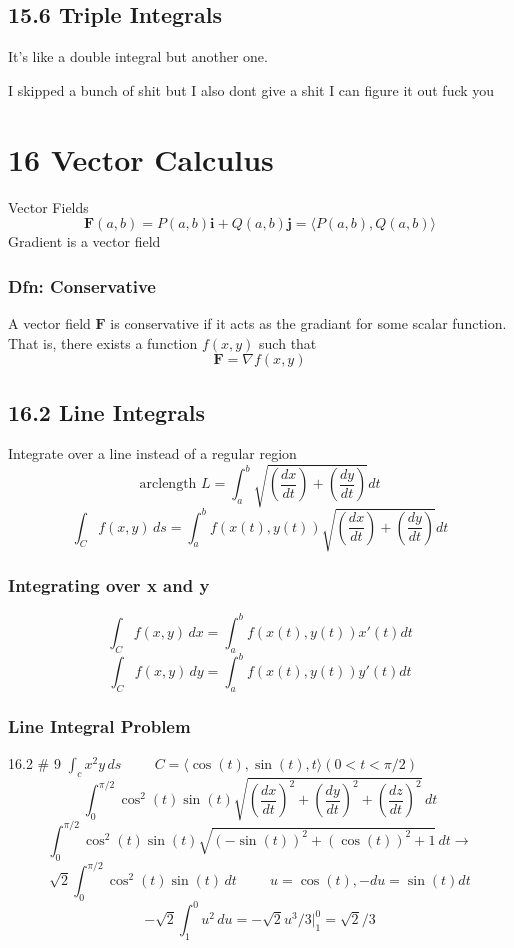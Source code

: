 \documentclass{report}
\begin{document}
\section{15.6 Triple Integrals}
It's like a double integral but another one.


I skipped a bunch of shit but I also dont give a shit I can figure it out fuck you



\chapter{16 Vector Calculus}
Vector Fields
$$
\mathbf{F}(a, b) = P(a, b)\mathbf{i} + Q(a, b)\mathbf{j} =
\langle P(a, b), Q(a, b) \rangle
$$
Gradient is a vector field

\subsection{Dfn: Conservative}
A vector field $\mathbf{F}$ is conservative if it acts as the gradiant for some scalar function. That is, there exists a function $f(x, y)$ such that 
$$
\mathbf{F} = \nabla f(x, y)
$$

\newpage
\section{16.2 Line Integrals}
Integrate over a line instead of a regular region
$$
\text{arclength } L = \int_a^b \sqrt{\left( \frac{dx}{dt} \right) + \left( \frac{dy}{dt} \right)} dt
$$
$$
\int_C f(x, y)\,ds = \int_a^b f(x(t), y(t)) \sqrt{\left( \frac{dx}{dt} \right) + \left( \frac{dy}{dt} \right)} dt
$$

\subsection*{Integrating over x and y}
$$
\int_C f(x, y)\,dx = \int_a^b f(x(t), y(t)) x'(t) dt
$$
$$
\int_C f(x, y)\,dy = \int_a^b f(x(t), y(t)) y'(t) dt
$$

\subsection{Line Integral Problem}
16.2 \# 9
$ \int_c x^2y \,ds \hspace{1cm} C = \langle \cos(t), \sin(t), t \rangle (0 < t < \pi/2) $
$$
\int_0^{\pi/2} \cos^2(t) \sin(t) \sqrt{(\frac{dx}{dt})^2 + (\frac{dy}{dt})^2 + (\frac{dz}{dt})^2} \, dt
$$
$$
\int_0^{\pi/2} \cos^2(t) \sin(t) \sqrt{(-\sin(t))^2 + (\cos(t))^2 + 1} \, dt
\rightarrow
$$
$$
\sqrt{2} \int_0^{\pi/2} \cos^2(t) \sin(t) \, dt 
\hspace{1cm}
u = \cos(t), -du = \sin(t)dt
$$
$$
-\sqrt{2} \int_1^0 u^2 \, du = -\sqrt{2}u^3/3\bigg|_1^0 = \sqrt{2}/3
$$
\end{document}
